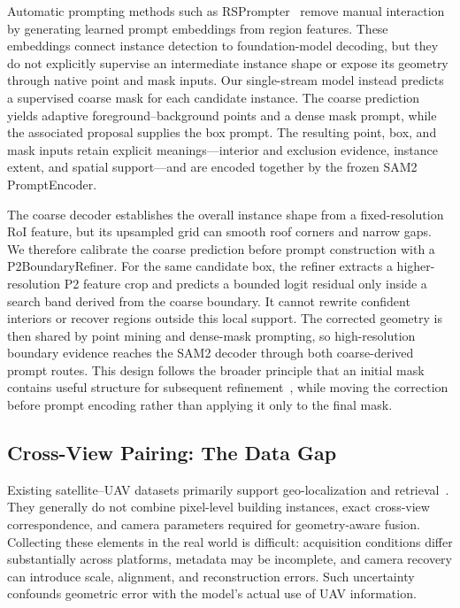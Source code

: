 \documentclass[letterpaper,journal]{IEEEtran}
\begin{document}
Automatic prompting methods such as RSPrompter~\cite{ref_rsprompter} remove manual interaction by generating learned prompt embeddings from region features. These embeddings connect instance detection to foundation-model decoding, but they do not explicitly supervise an intermediate instance shape or expose its geometry through native point and mask inputs. Our single-stream model instead predicts a supervised coarse mask for each candidate instance. The coarse prediction yields adaptive foreground--background points and a dense mask prompt, while the associated proposal supplies the box prompt. The resulting point, box, and mask inputs retain explicit meanings---interior and exclusion evidence, instance extent, and spatial support---and are encoded together by the frozen SAM2 PromptEncoder.

The coarse decoder establishes the overall instance shape from a fixed-resolution RoI feature, but its upsampled grid can smooth roof corners and narrow gaps. We therefore calibrate the coarse prediction before prompt construction with a P2BoundaryRefiner. For the same candidate box, the refiner extracts a higher-resolution P2 feature crop and predicts a bounded logit residual only inside a search band derived from the coarse boundary. It cannot rewrite confident interiors or recover regions outside this local support. The corrected geometry is then shared by point mining and dense-mask prompting, so high-resolution boundary evidence reaches the SAM2 decoder through both coarse-derived prompt routes. This design follows the broader principle that an initial mask contains useful structure for subsequent refinement~\cite{ref_pointrend,ref_cascadepsp,ref_segrefiner,ref_samrefiner}, while moving the correction before prompt encoding rather than applying it only to the final mask.

\subsection{Cross-View Pairing: The Data Gap}

Existing satellite--UAV datasets primarily support geo-localization and retrieval~\cite{ref_unigeo,ref_university}. They generally do not combine pixel-level building instances, exact cross-view correspondence, and camera parameters required for geometry-aware fusion. Collecting these elements in the real world is difficult: acquisition conditions differ substantially across platforms, metadata may be incomplete, and camera recovery can introduce scale, alignment, and reconstruction errors. Such uncertainty confounds geometric error with the model's actual use of UAV information.
\end{document}

